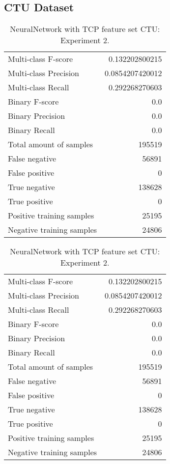 \subsection{CTU Dataset}

\begin{table}[H]
\begin{minipage}{0.5\textwidth}
\caption{NeuralNetwork with TCP feature set CTU: \\Experiment 1.}
\centering
\begin{tabular}{l r}
\toprule
Multi-class F-score & 0.132202800215 \\
Multi-class Precision & 0.0854207420012 \\
Multi-class Recall & 0.292268270603 \\
\midrule
Binary F-score & 0.0 \\
Binary Precision & 0.0 \\
Binary Recall & 0.0 \\
\midrule
Total amount of samples & 195519 \\
False negative & 56891 \\
False positive & 0 \\
True negative & 138628 \\
True positive & 0 \\
\midrule
Positive training samples & 25195 \\
Negative training samples & 24806 \\
\bottomrule
\end{tabular}
\end{minipage}
\hfillx
\begin{minipage}{0.5\textwidth}
\caption{NeuralNetwork with TCP feature set CTU: \\Experiment 2.}
\centering
\begin{tabular}{l r}
\toprule
Multi-class F-score & 0.132202800215 \\
Multi-class Precision & 0.0854207420012 \\
Multi-class Recall & 0.292268270603 \\
\midrule
Binary F-score & 0.0 \\
Binary Precision & 0.0 \\
Binary Recall & 0.0 \\
\midrule
Total amount of samples & 195519 \\
False negative & 56891 \\
False positive & 0 \\
True negative & 138628 \\
True positive & 0 \\
\midrule
Positive training samples & 25195 \\
Negative training samples & 24806 \\
\bottomrule
\end{tabular}
\end{minipage}
\end{table}
